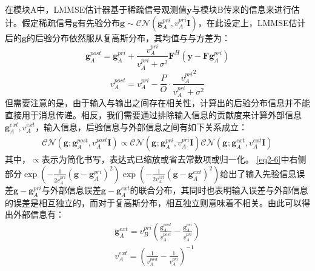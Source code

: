 \documentclass{xdupgthesis}
\begin{document}
在模块A中，LMMSE估计器基于稀疏信号观测值$\mathbf{y}$与模块B传来的信息来进行估计。假定稀疏信号$\mathbf{g}$有先验分布$\mathbf{g} \sim \mathcal{CN}(\mathbf{g}_{A}^{pri},v_{A}^{pri}\mathbf{I})$，在此设定上，LMMSE估计后的$\mathbf{g}$的后验分布依然服从复高斯分布\parencite{kay2013fundamentals}，其均值与与方差为：
\begin{equation}
    \mathbf{g}_{A}^{{post }}=\mathbf{g}_{A}^{p r i}+\frac{v_{A}^{p r i}}{v_{A}^{{pri }}+\sigma^{2}} \mathbf{F}^{H}\left({\mathbf{ y}}-\mathbf{F} \mathbf{g}_{A}^{ {pri }}\right)
\end{equation}
\begin{equation}
    v_{A}^{p o s t}=v_{A}^{p r i}-\frac{P}{O} \cdot \frac{{v_{A}^{p r i}}^{2}}{v_{A}^{p r i}+\sigma^{2}}
\end{equation}
但需要注意的是，由于输入与输出之间存在相关性，计算出的后验分布信息并不能直接用于消息传递。相反，我们需要通过排除输入信息的贡献度来计算外部信息$\mathbf{g}_{A}^{ext},{v}_{A}^{ext}$，输入信息，后验信息与外部信息之间有如下关系成立：
\begin{equation}
    \label{eq2-6}
    \begin{array}{l}
        \mathcal{C N}\left(\mathbf{g} ; \mathbf{g}_{A}^{p o s t}, v_{A}^{p o s t} \mathbf{I}\right) 
        \propto \mathcal{C N}\left(\mathbf{g}_{} ; \mathbf{g}_{A}^{p r i}, v_{A}^{p r i} \mathbf{I}\right) \mathcal{C N}\left(\mathbf{g}_{} ; \mathbf{g}_{A}^{e x t}, v_{A}^{e x t} \mathbf{I}\right)
        \end{array}
\end{equation}
其中，$\propto$表示为简化书写，表达式已缩放或省去常数项或归一化。 \eqref{eq2-6}中右侧部分$\exp \left(-\frac{1}{2 v_{A}^{pri}}\left(\mathbf{g}-\mathbf{g}_{A}^{pri}\right)^{2}\right)\exp \left(-\frac{1}{2 v_{A}^{e x t}}\left(\mathbf{g}-\mathbf{g}_{A}^{e x t}\right)^{2}\right)$给出了输入先验信息误差$\mathbf{g}-\mathbf{g}_{A}^{pri}$与外部信息误差$\mathbf{g}-\mathbf{g}_{A}^{e x t}$的联合分布，其同时也表明输入误差与外部信息的误差是相互独立的，而对于复高斯分布，相互独立则意味着不相关。由此可以得出外部信息有：
\begin{equation}
    \label{eq2-7}
    \begin{aligned}
        \mathbf{g}_{A}^{e x t}=v_{B}^{p r i}\left(\frac{\mathbf{g}_{A}^{{post }}}{v_{A}^{{post }}}-\frac{\mathbf{g}_{A}^{p r i}}{v_{A}^{p r i}}\right)\\
        v_{A}^{e x t}=\left(\frac{1}{v_{A}^{p o s t}}-\frac{1}{v_{A}^{p r i}}\right)^{-1}
    \end{aligned}
\end{equation}
\end{document}
